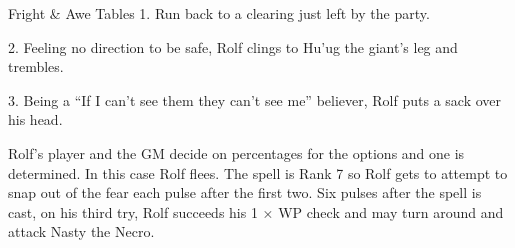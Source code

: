 \begin{Chapter}{Fright \& Awe Tables}
1. Run back to a clearing just left by the party. 

2. Feeling no direction to be safe, Rolf clings to Hu’ug the 
giant’s leg and trembles. 

3. Being a “If I can’t see them they can’t see me” believer, 
Rolf puts a sack over his head. 

Rolf’s  player  and  the  GM  decide  on  percentages  for  the 
options and one is determined. In this case Rolf flees. The 
spell  is  Rank  7  so  Rolf  gets  to  attempt  to  snap  out  of  the 
fear each pulse after the first two. Six pulses after the spell 
is  cast,  on  his  third  try,  Rolf  succeeds  his  1  ×  WP  check 
and may turn around and attack Nasty the Necro. 

\end{Chapter}
